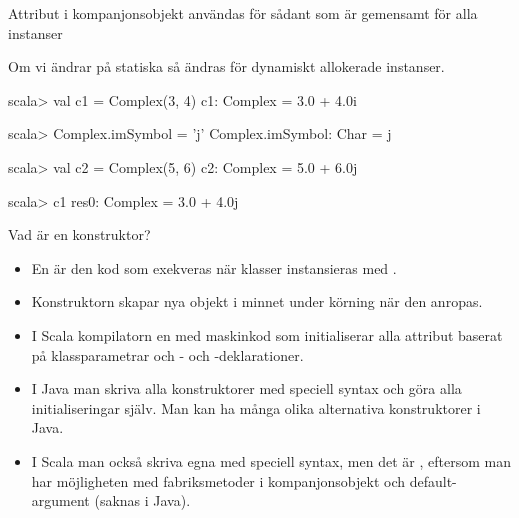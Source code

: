 \begin{Slide}{Attribut i kompanjonsobjekt användas för sådant som är gemensamt för alla instanser}

Om vi ändrar på statiska  så ändras  för  dynamiskt allokerade instanser.
\begin{REPLnonum}
scala> val c1 = Complex(3, 4)
c1: Complex = 3.0 + 4.0i

scala> Complex.imSymbol = 'j'
Complex.imSymbol: Char = j

scala> val c2 = Complex(5, 6)
c2: Complex = 5.0 + 6.0j

scala> c1
res0: Complex = 3.0 + 4.0j
\end{REPLnonum}
\end{Slide}







\begin{Slide}{Vad är en konstruktor?}
\begin{itemize}
\item En  är den kod som exekveras när klasser instansieras med .

\item Konstruktorn skapar nya objekt i minnet under körning när den anropas.

\item I Scala  kompilatorn en  med maskinkod som initialiserar alla attribut baserat på klassparametrar och - och -deklarationer.

\item I Java  man  skriva alla konstruktorer med speciell syntax och göra alla initialiseringar själv. Man kan ha många olika alternativa konstruktorer i Java.

\item I Scala  man också skriva egna  med speciell syntax, men det är , eftersom man har möjligheten med fabriksmetoder i kompanjonsobjekt och default-argument (saknas i Java).
\end{itemize}
\end{Slide}


